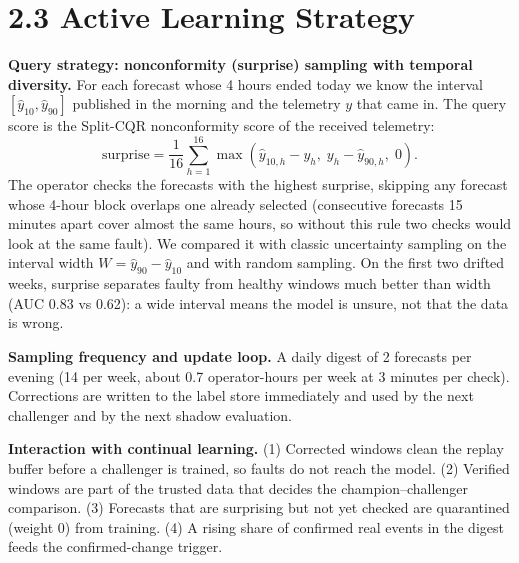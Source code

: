 \documentclass[11pt,letterpaper]{article}
\begin{document}
\section*{2.3 Active Learning Strategy}

\textbf{Query strategy: nonconformity (surprise) sampling with temporal diversity.} For each forecast whose 4 hours
ended today we know the interval $[\hat y_{10}, \hat y_{90}]$ published in the morning and the telemetry $y$ that
came in. The query score is the Split-CQR nonconformity score of the received telemetry:
\[
\text{surprise} = \frac{1}{16}\sum_{h=1}^{16} \max\!\left(\hat y_{10,h} - y_h,\; y_h - \hat y_{90,h},\; 0\right).
\]
The operator checks the forecasts with the highest surprise, skipping any forecast whose 4-hour block overlaps one
already selected (consecutive forecasts 15 minutes apart cover almost the same hours, so without this rule two checks
would look at the same fault). We compared it with classic uncertainty sampling on the interval width
$W=\hat y_{90}-\hat y_{10}$ and with random sampling. On the first two drifted weeks, surprise separates faulty from
healthy windows much better than width (AUC 0.83 vs 0.62): a wide interval means the model is unsure, not that the
data is wrong.

\textbf{Sampling frequency and update loop.} A daily digest of 2 forecasts per evening (14 per week, about
0.7 operator-hours per week at 3 minutes per check). Corrections are written to the label store immediately and used
by the next challenger and by the next shadow evaluation.

\textbf{Interaction with continual learning.}
(1) Corrected windows clean the replay buffer before a challenger is trained, so faults do not reach the model.
(2) Verified windows are part of the trusted data that decides the champion--challenger comparison.
(3) Forecasts that are surprising but not yet checked are quarantined (weight 0) from training.
(4) A rising share of confirmed real events in the digest feeds the confirmed-change trigger.
\end{document}
